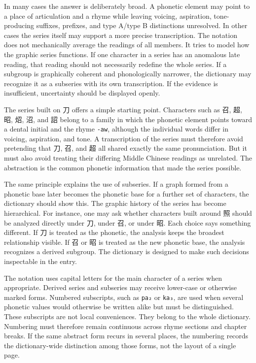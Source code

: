 In many cases the answer is deliberately broad. A phonetic element may point to a place of articulation and a rhyme while leaving voicing, aspiration, tone-producing suffixes, prefixes, and type A/type B distinctions unresolved. In other cases the series itself may support a more precise transcription. The notation does not mechanically average the readings of all members. It tries to model how the graphic series functions. If one character in a series has an anomalous late reading, that reading should not necessarily redefine the whole series. If a subgroup is graphically coherent and phonologically narrower, the dictionary may recognize it as a subseries with its own transcription. If the evidence is insufficient, uncertainty should be displayed openly.

The series built on 刀 offers a simple starting point. Characters such as 召, 超, 昭, 炤, 沼, and 詔 belong to a family in which the phonetic element points toward a dental initial and the rhyme \texttt{-aw}, although the individual words differ in voicing, aspiration, and tone. A transcription of the series must therefore avoid pretending that 刀, 召, and 超 all shared exactly the same pronunciation. But it must also avoid treating their differing Middle Chinese readings as unrelated. The abstraction is the common phonetic information that made the series possible.

The same principle explains the use of subseries. If a graph formed from a phonetic base later becomes the phonetic base for a further set of characters, the dictionary should show this. The graphic history of the series has become hierarchical. For instance, one may ask whether characters built around 照 should be analyzed directly under 刀, under 召, or under 昭. Each choice says something different. If 刀 is treated as the phonetic, the analysis keeps the broadest relationship visible. If 召 or 昭 is treated as the new phonetic base, the analysis recognizes a derived subgroup. The dictionary is designed to make such decisions inspectable in the entry.

The notation uses capital letters for the main character of a series when appropriate. Derived series and subseries may receive lower-case or otherwise marked forms. Numbered subscripts, such as \texttt{pa₂} or \texttt{ka₃}, are used when several phonetic values would otherwise be written alike but must be distinguished. These subscripts are not local conveniences. They belong to the whole dictionary. Numbering must therefore remain continuous across rhyme sections and chapter breaks. If the same abstract form recurs in several places, the numbering records the dictionary-wide distinction among those forms, not the layout of a single page.

